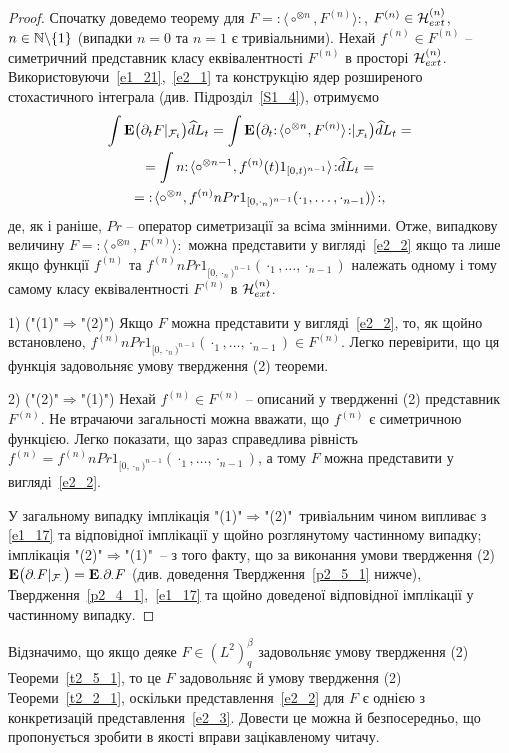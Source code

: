 \begin{proof}
Спочатку доведемо теорему для $F={:\!\langle}\circ^{\otimes n},F^{(n)}{\rangle\!:}$,
$F^{(n)}\in\mathcal{H}_{ext}^{(n)}$, $n\in\mathbb{N}\backslash\{1\}$ (випадки $n=0$ та $n=1$ є
тривіальними). Нехай $f^{(n)}\in F^{(n)}$ -- симетричний представник класу еквівалентності
$F^{(n)}$ в просторі $\mathcal{H}_{ext}^{(n)}$. Використовуючи~\eqref{e1_21},~\eqref{e2_1} та
конструкцію ядер розширеного стохастичного інтеграла (див. Підрозділ~\ref{S1_4}), отримуємо
\begin{gather*}
\int\mathbf{E}\big(\partial_t F|_{\mathcal F_t}\big)\widehat dL_t
=\int\mathbf{E}\big(\partial_t{:\!\langle}\circ^{\otimes n},F^{(n)}{\rangle\!:}
|_{\mathcal F_t}\big)\widehat dL_t=\\
=\int n{:\!\langle}\circ^{\otimes n-1},f^{(n)}(t)1_{[0,t)^{n-1}}{\rangle\!:}\widehat dL_t=\\
={:\!\langle}\circ^{\otimes n},
f^{(n)}nPr1_{[0,\cdot_n)^{n-1}}(\cdot_1,\dots,\cdot_{n-1}){\rangle\!:},
\end{gather*}
де, як і раніше, $Pr$  -- оператор симетризації за всіма змінними.
Отже, випадкову величину $F={:\!\langle}\circ^{\otimes n},F^{(n)}{\rangle\!:}$ можна представити
у вигляді~\eqref{e2_2} якщо та лише якщо функції $f^{(n)}$ та
$f^{(n)}nPr1_{[0,\cdot_n)^{n-1}}(\cdot_1,\dots,\cdot_{n-1})$ належать одному
і тому самому класу еквівалентності $F^{(n)}$ в $\mathcal{H}_{ext}^{(n)}$.

1) ("(1)"$\Rightarrow$"(2)") Якщо $F$ можна представити у вигляді~\eqref{e2_2}, то, як щойно
встановлено, $f^{(n)}nPr1_{[0,\cdot_n)^{n-1}}(\cdot_1,\dots,\cdot_{n-1})\in F^{(n)}$.
Легко перевірити, що ця функція задовольняє умову твердження (2) теореми.

2) ("(2)"$\Rightarrow$"(1)") Нехай $f^{(n)}\in F^{(n)}$ -- описаний у твердженні (2)
представник $F^{(n)}$. Не втрачаючи загальності можна вважати, що $f^{(n)}$ є симетричною
функцією. Легко показати, що зараз справедлива рівність
$f^{(n)}=f^{(n)}nPr1_{[0,\cdot_n)^{n-1}}(\cdot_1,\dots,\cdot_{n-1})$, а тому
$F$ можна представити у вигляді~\eqref{e2_2}.

У загальному випадку імплікація "(1)"$\Rightarrow$"(2)"\ тривіальним чином випливає з
\eqref{e1_17} та відповідної імплікації у щойно розглянутому частинному випадку;
імплікація "(2)"$\Rightarrow$"(1)"\ -- з того факту, що за виконання умови твердження
(2) $\mathbf{E}\big(\partial_\cdot F|_{\mathcal F_\cdot}\big)
=\mathbf{E}_\cdot\partial_\cdot F$ (див. доведення Твердження~\ref{p2_5_1} нижче),
Твердження~\ref{p2_4_1},~\eqref{e1_17} та щойно доведеної відповідної імплікації у частинному
випадку.
\end{proof}
\begin{subremark}\label{r2_5_1}
Відзначимо, що якщо деяке $F\in (L^2)^\beta_q$ задовольняє умову твердження (2)
Теореми~\ref{t2_5_1}, то це $F$ задовольняє й умову твердження (2) Теореми~\ref{t2_2_1},
оскільки представлення~\eqref{e2_2} для $F$ є однією з конкретизацій представлення~\eqref{e2_3}.
Довести це можна й безпосередньо, що пропонується зробити в якості вправи зацікавленому читачу.
\end{subremark}

